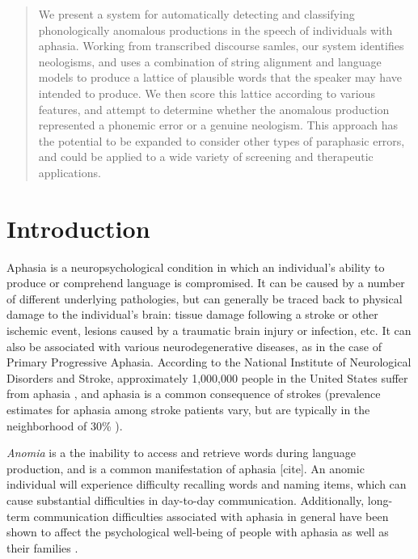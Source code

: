 \date{}



\maketitle

\begin{abstract}

We present a system for automatically detecting and classifying phonologically anomalous productions in the speech of individuals with aphasia.
Working from transcribed discourse samles, our system identifies neologisms, and uses a combination of string alignment and language models to produce a lattice of plausible words that the speaker may have intended to produce.
We then score this lattice according to various features, and attempt to determine whether the anomalous production represented a phonemic error or a genuine neologism.
This approach has the potential to be expanded to consider other types of paraphasic errors, and could be applied to a wide variety of screening and therapeutic applications.

\end{abstract}

\section{Introduction}

Aphasia is a neuropsychological condition in which an individual's ability to produce or comprehend language is compromised.
It can be caused by a number of different underlying pathologies, but can generally be traced back to physical damage to the individual's brain: tissue damage following a stroke or other ischemic event, lesions caused by a traumatic brain injury or infection, etc.
It can also be associated with various neurodegenerative diseases, as in the case of Primary Progressive Aphasia.
According to the National Institute of Neurological Disorders and Stroke, approximately 1,000,000 people in the United States suffer from aphasia \cite{National-Institute-of-Neurological-Disorders-and-Stroke:2014la}, and aphasia is a common consequence of strokes (prevalence estimates for aphasia among stroke patients vary, but are typically in the neighborhood of 30\% \cite{Engelter:2006da}).

\emph{Anomia} is a the inability to access and retrieve words during language production, and is a common manifestation of aphasia [cite].
An anomic individual will experience difficulty recalling words and naming items, which can cause substantial difficulties in day-to-day communication.
Additionally, long-term communication difficulties associated with aphasia in general have been shown to affect the psychological well-being of people with aphasia as well as their families \cite{doi:10.1080/02687030244000707,Gaete:2008jr,vanDijk:2015gz}.

